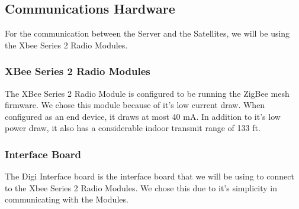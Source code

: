 
\subsection{Communications Hardware}

For the communication between the Server and the Satellites,
we will be using the Xbee Series 2 Radio Modules.

\subsubsection{XBee Series 2 Radio Modules}

The XBee Series 2 Radio Module is configured to be running
the ZigBee mesh firmware. We chose this module because of it's
low current draw. When configured as an end device, it draws at
most 40 m\ac{A}. In addition to it's low power draw, it also has a 
considerable indoor transmit range of 133 ft.

\subsubsection{Interface Board}

The Digi Interface board is the interface board that we will
be using to connect to the Xbee Series 2 Radio Modules. We 
chose this due to it's simplicity in communicating with the
Modules.
